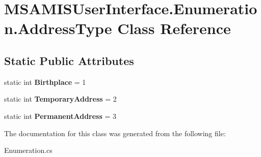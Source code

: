 \hypertarget{class_m_s_a_m_i_s_user_interface_1_1_enumeration_1_1_address_type}{}\section{M\+S\+A\+M\+I\+S\+User\+Interface.\+Enumeration.\+Address\+Type Class Reference}
\label{class_m_s_a_m_i_s_user_interface_1_1_enumeration_1_1_address_type}
\subsection*{Static Public Attributes}
\begin{DoxyCompactItemize}
\item 
\mbox{\label{class_m_s_a_m_i_s_user_interface_1_1_enumeration_1_1_address_type_a932a6084d4d2f352e7617b73689730b3}} 
static int {\bfseries Birthplace} = 1
\item 
\mbox{\label{class_m_s_a_m_i_s_user_interface_1_1_enumeration_1_1_address_type_aba4a32859bc07d419beb181686b849b3}} 
static int {\bfseries Temporary\+Address} = 2
\item 
\mbox{\label{class_m_s_a_m_i_s_user_interface_1_1_enumeration_1_1_address_type_af420e881da2a3da9b241fb107d0510fc}} 
static int {\bfseries Permanent\+Address} = 3
\end{DoxyCompactItemize}


The documentation for this class was generated from the following file\+:\begin{DoxyCompactItemize}
\item 
Enumeration.\+cs\end{DoxyCompactItemize}
